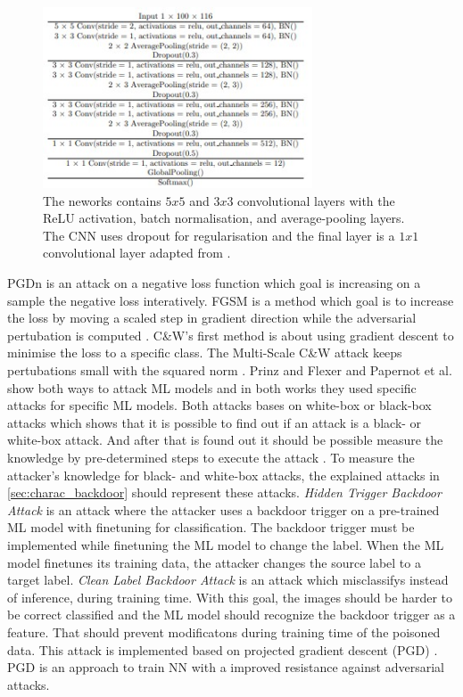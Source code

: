 \begin{figure}[ht!]
  \centering
  \includegraphics[width=8cm]{pictures/cnn_whitebox.jpg}
  \caption{The neworks contains $5x5$ and $3x3$ convolutional layers with the ReLU activation, batch normalisation, and average-pooling layers. The CNN uses dropout for regularisation and the final layer is a $1x1$ convolutional layer adapted from \cite{DBLP:journals/corr/abs-2007-14714}.}
  \label{fig:cnn_whitebox}
\end{figure}
PGDn is an attack on a negative loss function \cite{DBLP:journals/corr/MadryMSTV17} which goal is increasing on a sample the negative loss interatively. FGSM is a method which goal is to increase the loss by moving a scaled step in gradient direction while the adversarial pertubation is computed \cite{DBLP:journals/corr/GoodfellowSS14}. C\&W's first method is about using gradient descent to minimise the loss to a specific class. The Multi-Scale C\&W attack keeps pertubations small with the squared norm \cite{DBLP:conf/sp/Carlini018}.
Prinz and Flexer \cite{DBLP:journals/corr/abs-2007-14714} and Papernot et al. \cite{DBLP:conf/ccs/PapernotMGJCS17} show both ways to attack ML models and in both works they used specific attacks for specific ML models. Both attacks bases on white-box or black-box attacks which shows that it is possible to find out if an attack is a black- or white-box attack. And after that is found out it should be possible measure the knowledge by pre-determined steps to execute the attack \cite{bsi_2013}. To measure the attacker's knowledge for black- and white-box attacks, the explained attacks in \ref{sec:charac_backdoor} should represent these attacks. \textit{Hidden Trigger Backdoor Attack} \cite{DBLP:journals/corr/abs-1910-00033} is an attack where the attacker uses a backdoor trigger on a pre-trained ML model with finetuning for classification. The backdoor trigger must be implemented while finetuning the ML model to change the label. When the ML model finetunes its training data, the attacker changes the source label to a target label. \textit{Clean Label Backdoor Attack} \cite{turner2018clean} is an attack which misclassifys instead of inference, during training time. With this goal, the images should be harder to be correct classified and the ML model should recognize the backdoor trigger as a feature. That should prevent modificatons during training time of the poisoned data. This attack is implemented based on projected gradient descent (PGD) \cite{DBLP:journals/corr/MadryMSTV17}. PGD is an approach to train NN with a improved resistance against adversarial attacks.
